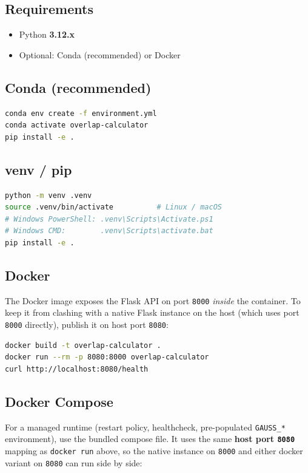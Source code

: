 \documentclass[11pt,a4paper]{article}
\begin{document}
\subsection*{Requirements}
\begin{itemize}
  \item Python \textbf{3.12.x}
  \item Optional: Conda (recommended) or Docker
\end{itemize}

\subsection*{Conda (recommended)}
\begin{lstlisting}[language=bash]
conda env create -f environment.yml
conda activate overlap-calculator
pip install -e .
\end{lstlisting}

\subsection*{venv / pip}
\begin{lstlisting}[language=bash]
python -m venv .venv
source .venv/bin/activate          # Linux / macOS
# Windows PowerShell: .venv\Scripts\Activate.ps1
# Windows CMD:        .venv\Scripts\activate.bat
pip install -e .
\end{lstlisting}

\subsection*{Docker}
The Docker image exposes the Flask API on port \texttt{8000}
\emph{inside} the container. To keep it from clashing with a native
Flask instance on the host (which uses port \texttt{8000} directly),
publish it on host port \texttt{8080}:
\begin{lstlisting}[language=bash]
docker build -t overlap-calculator .
docker run --rm -p 8080:8000 overlap-calculator
curl http://localhost:8080/health
\end{lstlisting}

\subsection*{Docker Compose}
For a managed runtime (restart policy, healthcheck, pre-populated
\texttt{GAUSS\_*} environment), use the bundled compose file. It
uses the same \textbf{host port \texttt{8080}} mapping as
\texttt{docker run} above, so the native instance on \texttt{8000}
and either docker variant on \texttt{8080} can run side by side:
\end{document}
